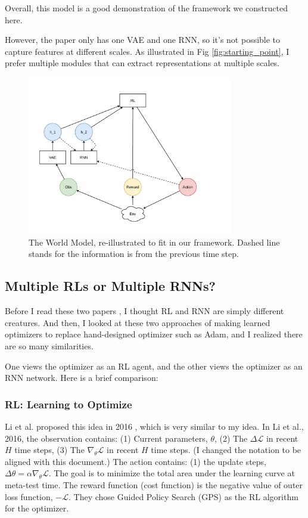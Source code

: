 Overall, this model is a good demonstration of the framework we constructed here.

However, the paper only has one VAE and one RNN, so it's not possible to capture features at different scales.
As illustrated in Fig \ref{fig:starting_point}, I prefer multiple modules that can extract representations at multiple scales.

\begin{figure}[h]
    \centering
    \includegraphics[width=0.8\textwidth]{images/world-model.pdf}
    \caption{The World Model, re-illustrated to fit in our framework. Dashed line stands for the information is from the previous time step.}
    \label{fig:world_model}
\end{figure}

\subsection{Multiple RLs or Multiple RNNs?} \label{section:multi-rl-or-multi-rnn}
Before I read these two papers \cite{li2017learning}\cite{andrychowicz2016learning}, I thought RL and RNN are simply different creatures.
And then, I looked at these two approaches of making learned optimizers to replace hand-designed optimizer such as Adam, and I realized there are so many similarities.

One views the optimizer as an RL agent\cite{li2017learning}, and the other views the optimizer as an RNN network\cite{andrychowicz2016learning}.
Here is a brief comparison:

\subsubsection{RL: Learning to Optimize}
% 
Li et al. proposed this idea in 2016 \cite{li2016learning}, which is very similar to my idea.
In Li et al., 2016, the observation contains: (1) Current parameters, $\theta$, (2) The $\Delta \mathcal{L}$ in recent $H$ time steps, (3) The $\nabla_{\theta} \mathcal{L}$ in recent $H$ time steps. (I changed the notation to be aligned with this document.)
The action contains: (1) the update steps, $\Delta \theta = \alpha \nabla_{\theta} \mathcal{L}$.
The goal is to minimize the total area under the learning curve at meta-test time.
The reward function (cost function) is the negative value of outer loss function, $- \mathcal{L}$.
They chose Guided Policy Search (GPS) as the RL algorithm for the optimizer.

